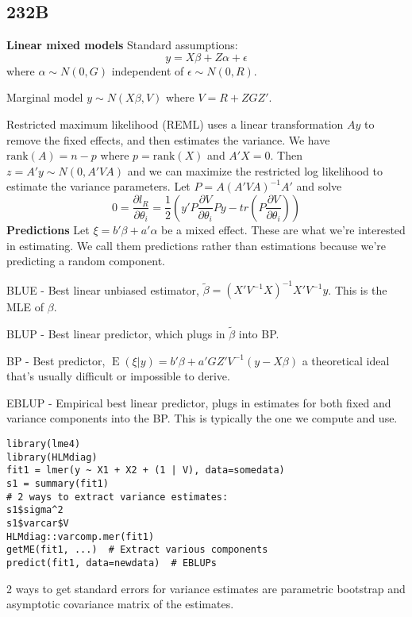 \documentclass[10pt, twocolumn]{article}
\newcommand{\Expect}{\operatorname{E}}
\begin{document}
\newpage

\subsection*{232B}

\textbf{Linear mixed models} Standard assumptions:
\[
    y = X \beta + Z \alpha + \epsilon
\]
where $\alpha \sim N(0, G)$ independent of  $\epsilon \sim N(0, R)$.

Marginal model $y \sim N(X \beta, V)$ where $V = R + ZGZ'$.

Restricted maximum likelihood (REML) uses a linear transformation
$Ay$ to remove the fixed effects, and then estimates the variance.
We have $\text{rank} (A) = n - p$ where $p = \text{rank} (X)$ and $A'X =
0$. Then $z = A'y \sim N(0, A'VA)$ and we can maximize the restricted log likelihood
to estimate the variance parameters. Let $P = A(A'VA)^{-1}A'$ and solve
\[
    0 = \frac{\partial l_R}{\partial \theta_i} = \frac{1}{2}
    \left( y'P \frac{\partial V}{\partial \theta_i} Py 
    - tr (P \frac{\partial V}{\partial \theta_i})
    \right)
\]
\textbf{Predictions}
Let $\xi = b' \beta + a' \alpha$ be a mixed effect. These are what we're
interested in estimating. We call them predictions rather than estimations
because we're predicting a random component.

BLUE - Best linear unbiased estimator, 
$\tilde{\beta} = (X' V^{-1} X)^{-1} X' V^{-1} y$. This is the MLE of
$\beta$.

BLUP - Best linear predictor, which plugs in $\tilde{\beta}$ into BP.

BP - Best predictor, $\Expect (\xi | y) = b' \beta + a' G Z' V^{-1} (y - X
\beta)$ a theoretical ideal that's
usually difficult or impossible to derive.

EBLUP - Empirical best linear predictor, plugs in estimates for both fixed
and variance components into the BP. This is
typically the one we compute and use.

\begin{verbatim}
library(lme4)
library(HLMdiag)
fit1 = lmer(y ~ X1 + X2 + (1 | V), data=somedata)
s1 = summary(fit1)
# 2 ways to extract variance estimates:
s1$sigma^2
s1$varcar$V
HLMdiag::varcomp.mer(fit1)
getME(fit1, ...)  # Extract various components
predict(fit1, data=newdata)  # EBLUPs
\end{verbatim}

2 ways to get standard errors for variance estimates are parametric
bootstrap and asymptotic covariance matrix of the estimates.
\end{document}
